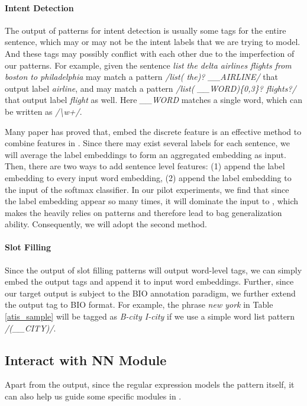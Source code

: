 \paragraph{Intent Detection}
The output of \RE patterns for intent detection is usually some tags for the entire sentence, which may or may not be the intent labels that we are trying to model. And these tags may possibly conflict with each other due to the imperfection of our patterns. 
For example, given the sentence \emph{list the delta airlines flights from boston to philadelphia} may match a pattern \textsl{/list( the)? \_\_AIRLINE/} that output label \emph{airline}, and may match a pattern \textsl{/list( \_\_WORD)\{0,3\}? flights?/} that output label \emph{flight} as well. Here \emph{\_\_WORD} matches a single word, which can be written as \textsl{/\textbackslash w+/}.

Many paper has proved that, embed the discrete feature is an effective method to combine features in \NN \cite{zeng2014relation, guo2017deepfm}. Since there may exist several labels for each sentence, we will average the label embeddings to form an aggregated embedding as input. 
Then, there are two ways to add sentence level features: (1) append the label embedding to every input word embedding, (2) append the label embedding to the input of the softmax classifier. In our pilot experiments, we find that since the label embedding appear so many times, it will dominate the input to \NN, which makes the \NN heavily relies on \RE patterns and therefore lead to bag generalization ability. Consequently, we will adopt the second method.


\paragraph{Slot Filling}
Since the output of slot filling \RE patterns will output word-level tags, we can simply embed the output tags and append it to input word embeddings. Further, since our target output is subject to the BIO annotation paradigm, we further extend the output tag to BIO format. For example, the phrase \emph{new york} in Table \ref{atis_sample} will be tagged as \emph{B-city I-city} if we use a simple word list pattern \textsl{/(\_\_CITY)/}.

\subsection{Interact with NN Module}
Apart from the \RE output, since the regular expression models the pattern itself, it can also help us guide some specific modules in \NN. 

